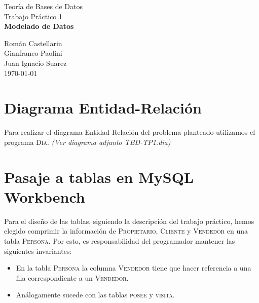 \documentclass[12pt]{article}
\begin{document}
\begin{titlepage}
\vspace{0.5cm}

\begin{center}
\normalsize{\sc Teoría de Bases de Datos}\\
\vspace{0.5cm}
\large{Trabajo Práctico 1}\\

\Large{\bf Modelado de Datos}\\
\vspace{5cm}

\normalsize
Román Castellarin\\
Gianfranco Paolini\\
Juan Ignacio Suarez\\


\vspace*{0.5cm}
\small{ \today }


\end{center}
\end{titlepage}
\newpage
\section{Diagrama Entidad-Relación}
Para realizar el diagrama Entidad-Relación del problema planteado utilizamos el programa \textsc{Dia}.
\textit{(Ver diagrama adjunto TBD-TP1.dia)}

\begin{figure}[H]


\end{figure}
\newpage
\section{Pasaje a tablas en MySQL Workbench}
Para el diseño de las tablas, siguiendo la descripción del trabajo práctico, hemos elegido comprimir la información de \textsc{Propietario}, \textsc{Cliente} y \textsc{Vendedor} en una tabla \textsc{Persona}. Por esto, es responsabilidad del programador mantener las siguientes invariantes:

\begin{itemize}
\item
En la tabla \textsc{Persona} la columna \textsc{Vendedor} tiene que hacer referencia a una fila correspondiente a un \textsc{Vendedor}.
\item
Análogamente sucede con las tablas \textsc{posee} y \textsc{visita}.
\end{itemize}
\end{document}
